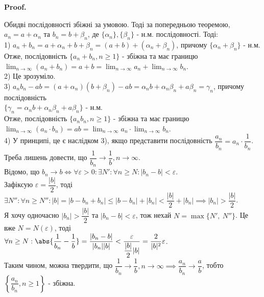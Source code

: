 \documentclass[a4paper, 14pt]{article}
\makeatletter
\def\qed{$\blacksquare$}
\theoremstyle{theoremdd}
\theoremstyle{theoremdd}
\theoremstyle{theoremdd}
\theoremstyle{theoremdd}
\theoremstyle{theoremdd}
\theoremstyle{theoremdd}
\theoremstyle{theoremdd}
\theoremstyle{theoremdd}
\renewenvironment{proof}[1][Proof.\\]{\par
\pushQED{\hfill \qed}%
\normalfont \topsep6\p@\@plus6\p@\relax
\trivlist
\item\relax
{\bfseries
#1\@addpunct{.}}\hspace\labelsep\ignorespaces
}{%
\popQED\endtrivlist\@endpefalse
}
\makeatother
\begin{document}
	\begin{proof}
	Обидві послідовності збіжні за умовою. Тоді за попередньою теоремою, $a_n = a + \alpha_n$ та $b_n=b+\beta_n$, де $\{\alpha_n\}, \{\beta_n\}$ - н.м. послідовності. Тоді:\\
	1) $a_n+b_n=a+\alpha_n+b+\beta_n=(a+b)+(\alpha_n+\beta_n)$, причому $\{\alpha_n + \beta_n\}$ - н.м. \\ Отже, послідовність $\{a_n+b_n, n \geq 1\}$ - збіжна та має границю $\displaystyle \lim_{n \to \infty} (a_n+b_n) = a+b = \lim_{n \to \infty} a_n+\lim_{n \to \infty} b_n$.
	\bigskip \\
	2) Це зрозуміло.
	\bigskip \\
	3) $a_n b_n - ab = (a+\alpha_n)(b+\beta_n) - ab = \alpha_n b + \alpha_n \beta_n + a \beta_n = \gamma_n$, причому послідовність \\ $\{\gamma_n = \alpha_n b + \alpha_n \beta_n + a \beta_n \}$ - н.м. \\
	Отже, послідовність $\{a_n b_n, n \geq 1\}$ - збіжна та має границю $\displaystyle \lim_{n \to \infty} (a_n \cdot b_n) = ab = \lim_{n \to \infty} a_n \cdot \lim_{n \to \infty} b_n$.
	\bigskip \\
	4) У принципі, це є наслідком 3), якщо представити послідовність $\dfrac{a_n}{b_n} = a_n \cdot \dfrac{1}{b_n}$. Треба лишень довести, що $\dfrac{1}{b_n} \to \dfrac{1}{b}, n \to \infty$.\\
	Відомо, що $b_n \to b \iff \forall \varepsilon > 0: \exists N': \forall n \geq N: |b_n-b| < \varepsilon$.\\
	Зафіксую $\varepsilon = \dfrac{|b|}{2}$, тоді $\exists N'': \forall n \geq N'':  |b| = |b - b_n + b_n| \leq |b - b_n| + |b_n| < \dfrac{|b|}{2} + |b_n| \implies |b_n| > \dfrac{|b|}{2}$.\\
	Я хочу одночасно $|b_n| > \dfrac{|b|}{2}$ та $|b_n - b| < \varepsilon$, тож нехай $N = \max \{N', \ N'' \}$. Це вже $N = N(\varepsilon)$, тоді\\
	$\forall n \geq N: \abs{\dfrac{1}{b_n} - \dfrac{1}{b}} = \dfrac{|b_n -b|}{|b_n| |b|} < \dfrac{\varepsilon}{ \dfrac{|b|}{2} |b|} = \dfrac{2}{|b|^2} \varepsilon$.\\
	Таким чином, можна твердити, що $\dfrac{1}{b_n} \to \dfrac{1}{b}, n \to \infty \implies \dfrac{a_n}{b_n} \to \dfrac{a}{b}$, тобто $\left\{ \dfrac{a_n}{b_n}, n \geq 1 \right\}$ - збіжна.
	\end{proof}
	
\end{document}
